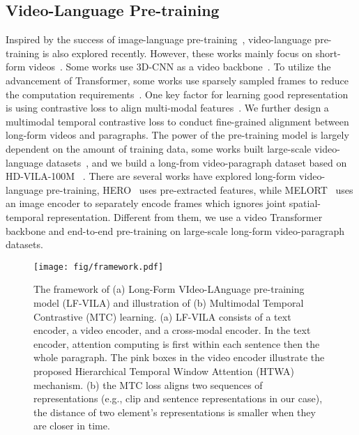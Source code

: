 \documentclass{article}
\begin{document}
\subsection{Video-Language Pre-training}
Inspired by the success of image-language pre-training~\cite{chen2020uniter,huang2021soho,huang2020pixelbert, huo2021wenlan,jia2021align,Alec2021CLIP,xue2021probing}, video-language pre-training is also explored recently. However, these works mainly focus on short-form videos~\cite{bain2021frozen,miech2020milnce,miech2019howto100m,xue2021hdvila}. Some works use 3D-CNN as a video backbone~\cite{miech2020milnce, miech2019howto100m}. To utilize the advancement of Transformer, some works use sparsely sampled frames to reduce the computation requirements~\cite{bain2021frozen,xue2021hdvila}. One key factor for learning good representation is using contrastive loss to align multi-modal features~\cite{bain2021frozen,miech2020milnce,miech2019howto100m,xue2021hdvila,zellers2021merlot}. We further design a multimodal temporal contrastive loss to conduct fine-grained alignment between long-form videos and paragraphs.
The power of the pre-training model is largely dependent on the amount of training data, some works built large-scale video-language datasets~\cite{miech2019howto100m,xue2021hdvila,zellers2021merlot}, and we build a long-from video-paragraph dataset based on HD-VILA-100M    ~\cite{xue2021hdvila}. There are several works have explored long-form video-language pre-training, HERO~\cite{li2020hero} uses pre-extracted features, while MELORT~\cite{zellers2021merlot} uses an image encoder to separately encode frames which ignores joint spatial-temporal representation. Different from them, we use a video Transformer backbone and end-to-end pre-training on large-scale long-form video-paragraph datasets. \begin{figure}
    \centering
    \texttt{[image: fig/framework.pdf]}
    \caption{The framework of (a) Long-Form VIdeo-LAnguage pre-training model (LF-VILA) and illustration of (b) Multimodal Temporal Contrastive (MTC) learning. (a) LF-VILA consists of a text encoder, a video encoder, and a cross-modal encoder. In the text encoder, attention computing is first within each sentence then the whole paragraph. The pink boxes in the video encoder illustrate the proposed Hierarchical Temporal Window Attention (HTWA) mechanism. (b) the MTC loss aligns two sequences of representations (e.g., clip and sentence representations in our case), the distance of two element's representations is smaller when they are closer in time.\vspace{-5mm}}
    \label{fig:framework}
\end{figure}
\end{document}
